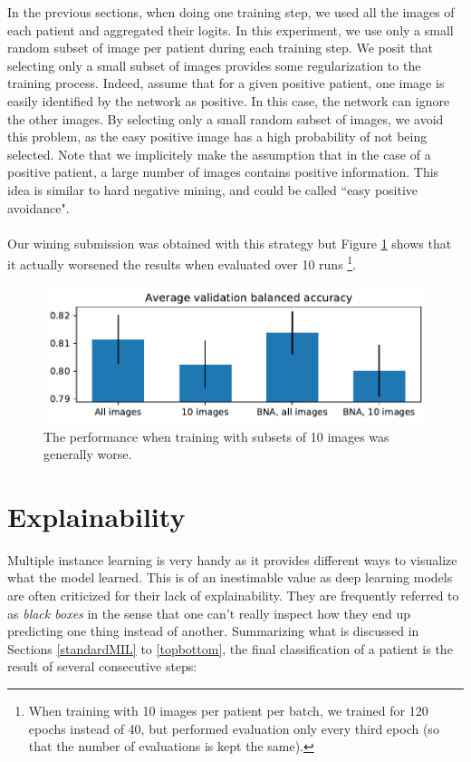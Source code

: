 \documentclass[final]{cvpr}
\begin{document}
	In the previous sections, when doing one training step, we used all the images of each patient and aggregated their logits.
	In this experiment, we use only a small random subset of image per patient during each training step. 
	We posit that selecting only a small subset of images provides some regularization to the training process. Indeed, assume that for a given positive patient, one image is easily identified by the network as positive. In this case, the network can ignore the other images. By selecting only a small random subset of images, we avoid this problem, as the easy positive image has a high probability of not being selected. Note that we implicitely make the assumption that in the case of a positive patient, a large number of images contains positive information. This idea is similar to hard negative mining, and could be called ``easy positive avoidance".\\
	\\
	Our wining submission was obtained with this strategy but Figure \ref{fig:num_img} shows that it actually worsened the results when evaluated over 10 runs \footnote{When training with 10 images per patient per batch, we trained for 120 epochs instead of 40, but performed evaluation only every third epoch (so that the number of evaluations is kept the same).}.
	
	\begin{figure}[t]
		\begin{center}
			\includegraphics[width=0.95\linewidth]{fig/num_img_bal_acc.pdf}
		\end{center}
		\caption{The performance when training with subsets of 10 images was generally worse.}
		\label{fig:num_img}
	\end{figure}
	
	\section{Explainability}
	
	Multiple instance learning is very handy as it provides different ways to visualize what the model learned. This is of an inestimable value as deep learning models are often criticized for their lack of explainability. They are frequently referred to as \textit{black boxes} in the sense that one can’t really inspect how they end up predicting one thing instead of another. Summarizing what is discussed in Sections \ref{standardMIL} to \ref{topbottom}, the final classification of a patient is the result of several consecutive steps:
	
\end{document}
